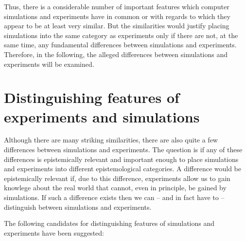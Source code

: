 \documentclass[onecollarge]{STJour}
\numberwithin{equation}{section}
\begin{document}
Thus, there is a considerable number of important features which computer simulations and experiments have in common or with regards to which they appear to be at least very similar. But the similarities  would justify placing simulations into the same category as experiments only if there are not, at the same time, any fundamental differences between simulations and experiments. Therefore, in the following, the alleged differences between simulations and experiments will be examined.

\section{Distinguishing features of experiments and simulations}
\label{DifferencesExSim}

Although there are many striking similarities, there are also quite a few differences between simulations and experiments. The question is if any of these differences is epistemically relevant and important enough to place simulations and experiments into different epistemological categories. A difference would be epistemically relevant if, due to this difference, experiments allow us to gain knowlege about the real world that cannot, even in principle, be gained by simulations. If such a difference exists then we can --    and in fact have to -- distinguish between simulations and experiments. 

The following candidates for distinguishing features of simulations and
experiments have been suggested:
\end{document}
